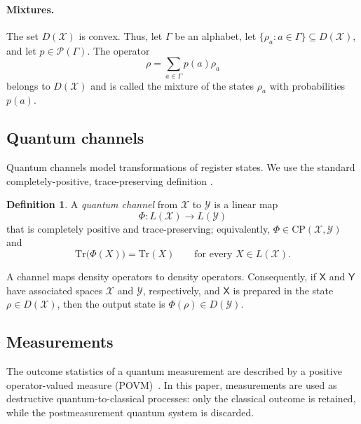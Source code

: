 \documentclass[
    aps,
    pra,
    reprint,
    superscriptaddress,
    nofootinbib
]{revtex4-2}
\theoremstyle{definition}
\newtheorem{definition}{Definition}[section]
\theoremstyle{plain}
\begin{document}
\paragraph{Mixtures.}

The set $D(\mathcal{X})$ is convex. Thus, let $\Gamma$ be an alphabet, let
$\{\rho_a:a\in\Gamma\}\subseteq D(\mathcal{X})$, and let
$p\in\mathcal{P}(\Gamma)$. The operator
\begin{equation}
    \rho=\sum_{a\in\Gamma}p(a)\rho_a
\end{equation}
belongs to $D(\mathcal{X})$ and is called the mixture of the states
$\rho_a$ with probabilities $p(a)$.

\subsection{Quantum channels}

Quantum channels model transformations of register states. We use
the standard completely-positive, trace-preserving definition
\cite[Def.~2.13]{Watrous2018}.

\begin{definition}
    A \emph{quantum channel} from $\mathcal{X}$ to $\mathcal{Y}$ is a linear
    map
    \begin{equation}
        \Phi:L(\mathcal{X})\to L(\mathcal{Y})
        \label{eq:qc}
    \end{equation}
    that is completely positive and trace-preserving; equivalently,
    $\Phi\in\mathrm{CP}(\mathcal{X},\mathcal{Y})$ and
    \begin{equation}
        \mathrm{Tr}\bigl(\Phi(X)\bigr)=\mathrm{Tr}(X)
        \qquad\text{for every }X\in L(\mathcal{X}).
    \end{equation}
\end{definition}

A channel maps density operators to density operators. Consequently, if
$\mathsf{X}$ and $\mathsf{Y}$ have associated spaces $\mathcal{X}$ and
$\mathcal{Y}$, respectively, and $\mathsf{X}$ is prepared in the state
$\rho\in D(\mathcal{X})$, then the output state is
$\Phi(\rho)\in D(\mathcal{Y})$.

\subsection{Measurements}

The outcome statistics of a quantum measurement are described by a positive
operator-valued measure (POVM)~\cite[Def.~2.34]{Watrous2018}. In this paper,
measurements are used as destructive quantum-to-classical processes: only the
classical outcome is retained, while the postmeasurement quantum system is
discarded.
\end{document}
